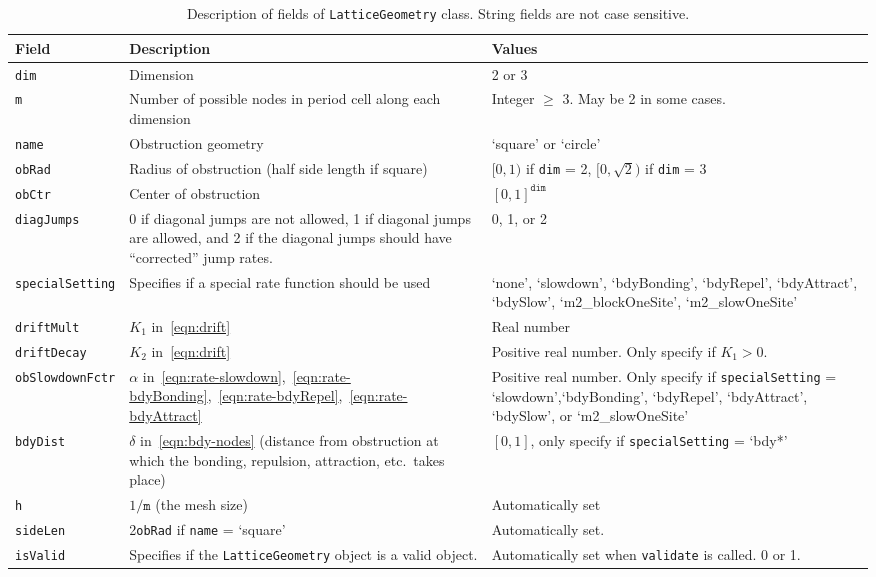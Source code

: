 \documentclass[11pt, oneside]{article}   	%
\theoremstyle{definition}
\begin{document}
\begin{table}
   \centering
   \begin{tabularx}{\linewidth}{lLL} %
      \toprule
      Field     & Description & Values \\
      \midrule
      \texttt{dim}				& Dimension & 2 or 3 \\
      \texttt{m}				& Number of possible nodes in period cell along each dimension & Integer $\geq$ 3. May be 2 in some cases.\\
      \texttt{name} 			& Obstruction geometry & `square' or `circle' \\
      \texttt{obRad}			& Radius of obstruction (half side length if square) & $[0,1)$ if \texttt{dim} = 2, $[0,\sqrt{2})$ if \texttt{dim} = 3 \\
      \texttt{obCtr}			& Center of obstruction & $[0,1]^{\texttt{dim}}$\\
      \texttt{diagJumps}		& 0 if diagonal jumps are not allowed, 1 if diagonal jumps are allowed, and 2 if the diagonal jumps should have ``corrected'' jump rates. & 0, 1, or 2 \\
      \texttt{specialSetting} 	& Specifies if a special rate function should be used & `none', `slowdown', `bdyBonding', `bdyRepel', `bdyAttract', `bdySlow', `m2\_blockOneSite', `m2\_slowOneSite' \\
      \texttt{driftMult}		& $K_1$ in~\eqref{eqn:drift} & Real number \\
      \texttt{driftDecay}		& $K_2$ in~\eqref{eqn:drift} & Positive real number. Only specify if $K_1 > 0$. \\
      \texttt{obSlowdownFctr}	& $\alpha$ in~\eqref{eqn:rate-slowdown},~\eqref{eqn:rate-bdyBonding},~\eqref{eqn:rate-bdyRepel},~\eqref{eqn:rate-bdyAttract} & Positive real number. Only specify if \texttt{specialSetting} = `slowdown',`bdyBonding', `bdyRepel', `bdyAttract', `bdySlow', or `m2\_slowOneSite' \\
      \texttt{bdyDist}			& $\delta$ in~\eqref{eqn:bdy-nodes} (distance from obstruction at which the bonding, repulsion, attraction, etc.\ takes place) & $[0,1]$, only specify if \texttt{specialSetting} = `bdy*' \\
      \texttt{h}				& $1/\texttt{m}$ (the mesh size) & Automatically set \\
      \texttt{sideLen}			& 2\texttt{obRad} if \texttt{name} = `square' & Automatically set.\\
      \texttt{isValid}			& Specifies if the \texttt{LatticeGeometry} object is a valid object. & Automatically set when \texttt{validate} is called. 0 or 1.\\
      \bottomrule
   \end{tabularx}
   \caption{Description of fields of \texttt{LatticeGeometry} class. String fields are not case sensitive.}
   \label{tab:latticegeometry-fields}
\end{table}
\end{document}
